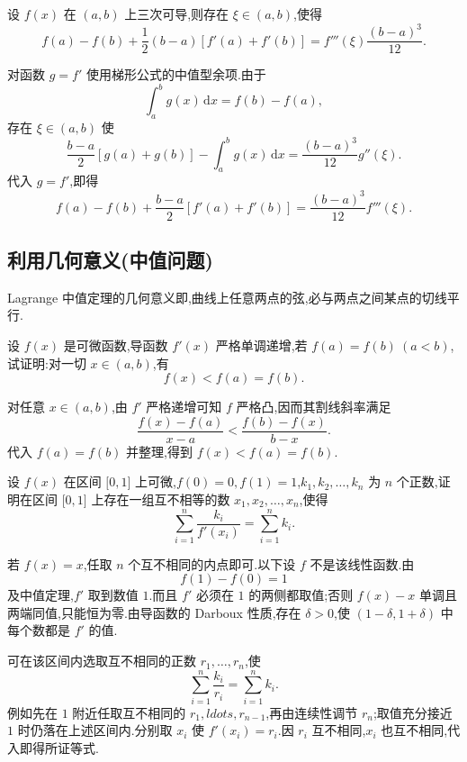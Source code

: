 \begin{example}
    设 $f(x)$ 在 $(a,b)$ 上三次可导,则存在 $\xi\in(a,b)$,使得
    \[
        f(a)-f(b)+\dfrac{1}{2}(b-a)[f'(a)+f'(b)]
        =f'''(\xi)\dfrac{(b-a)^3}{12}.
    \]
\end{example}
\exampleblank

\begin{solution}
    对函数 $g=f'$ 使用梯形公式的中值型余项.由于
    \[
        \int_a^b g(x)\,\mathrm{d}x=f(b)-f(a),
    \]
    存在 $\xi\in(a,b)$ 使
    \[
        \dfrac{b-a}{2}[g(a)+g(b)]
        -\int_a^b g(x)\,\mathrm{d}x
        =\dfrac{(b-a)^3}{12}g''(\xi).
    \]
    代入 $g=f'$,即得
    \[
        f(a)-f(b)+\dfrac{b-a}{2}[f'(a)+f'(b)]
        =\dfrac{(b-a)^3}{12}f'''(\xi).
    \]
\end{solution}



\subsection{利用几何意义(中值问题)}

Lagrange 中值定理的几何意义即,曲线上任意两点的弦,必与两点之间某点的切线平行.

\begin{example}
    设 $f(x)$ 是可微函数,导函数 $f'(x)$ 严格单调递增,若 $f(a)=f(b)\ (a<b)$,试证明:对一切 $x\in(a,b)$,有
    \[
        f(x)<f(a)=f(b).
    \]
\end{example}
\exampleblank

\begin{solution}
    对任意 $x\in(a,b)$,由 $f'$ 严格递增可知 $f$ 严格凸,因而其割线斜率满足
    \[
        \dfrac{f(x)-f(a)}{x-a}
        <\dfrac{f(b)-f(x)}{b-x}.
    \]
    代入 $f(a)=f(b)$ 并整理,得到 $f(x)<f(a)=f(b)$.
\end{solution}

\begin{example}
    设 $f(x)$ 在区间 $\lbrack 0,1\rbrack$ 上可微,$f(0)=0,f(1)=1$,$k_1,k_2,\ldots,k_n$ 为 $n$ 个正数,证明在区间 $\lbrack 0,1\rbrack$ 上存在一组互不相等的数 $x_1,x_2,\ldots,x_n$,使得
    \[
        \sum\limits_{i=1}^n\dfrac{k_i}{f'(x_i)}
        =\sum\limits_{i=1}^n k_i.
    \]
\end{example}
\exampleblank

\begin{solution}
    若 $f(x)=x$,任取 $n$ 个互不相同的内点即可.以下设 $f$ 不是该线性函数.由
    \[
        f(1)-f(0)=1
    \]
    及中值定理,$f'$ 取到数值 $1$.而且 $f'$ 必须在 $1$ 的两侧都取值;否则 $f(x)-x$ 单调且两端同值,只能恒为零.由导函数的 Darboux 性质,存在 $\delta>0$,使 $(1-\delta,1+\delta)$ 中每个数都是 $f'$ 的值.

    可在该区间内选取互不相同的正数 $r_1,\ldots,r_n$,使
    \[
        \sum\limits_{i=1}^{n}\dfrac{k_i}{r_i}
        =\sum\limits_{i=1}^{n}k_i.
    \]
    例如先在 $1$ 附近任取互不相同的 $r_1,ldots,r_{n-1}$,再由连续性调节 $r_n$;取值充分接近 $1$ 时仍落在上述区间内.分别取 $x_i$ 使 $f'(x_i)=r_i$.因 $r_i$ 互不相同,$x_i$ 也互不相同,代入即得所证等式.
\end{solution}

